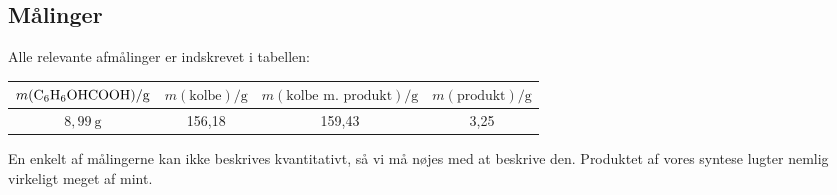 \pagebreak
\subsection*{Målinger}
Alle relevante afmålinger er indskrevet i tabellen:

\begin{table}[h]
    \centering
    \begin{tabular}{|c|c|c|c|}
    \hline
    $m(\ce{C6H6OHCOOH})/\unit{\gram}$
    & $m(\text{kolbe})/\unit{\gram}$ 
    & $m(\text{kolbe m.~produkt})/\unit{\gram}$ & $m(\text{produkt})/\unit{\gram}$ \\ \hline
    $8{,}99\ \unit{\gram}$ & 156{,}18 & 159{,}43 & 3{,}25 \\ \hline
    \end{tabular}
    En enkelt af målingerne kan ikke beskrives kvantitativt,
    så vi må nøjes med at beskrive den. Produktet af vores syntese
    lugter nemlig virkeligt meget af mint.
\end{table}
